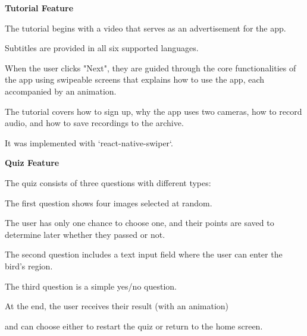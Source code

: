 \textbf{Tutorial Feature}

The tutorial begins with a video that serves as an advertisement for the app.

Subtitles are provided in all six supported languages.

When the user clicks "Next", they are guided through the core functionalities of the app using swipeable screens that explains how to use the app, each accompanied by an animation.

The tutorial covers how to sign up, why the app uses two cameras, how to record audio, and how to save recordings to the archive.

It was implemented with `react-native-swiper`.


\textbf{Quiz Feature}

The quiz consists of three questions with different types:

The first question shows four images selected at random. 

The user has only one chance to choose one, and their points are saved to determine later whether they passed or not.

The second question includes a text input field where the user can enter the bird’s region.

The third question is a simple yes/no question.

At the end, the user receives their result (with an animation) 

and can choose either to restart the quiz or return to the home screen.